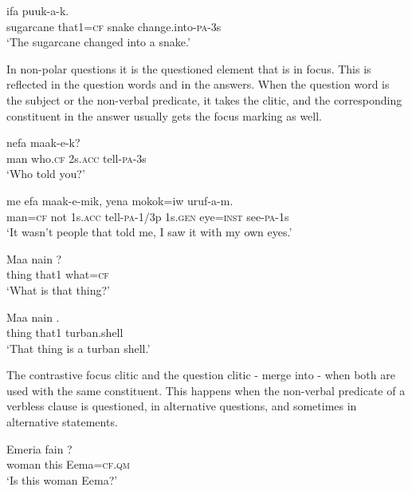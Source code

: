 \ea%
\label{ex:x1711}
\gll {}    ifa  puuk-a-k. \\
sugarcane  that1=\textsc{cf}  snake  change.into-\textsc{pa}-3s      \\
\glt`The sugarcane changed into a snake.'
\z


In non-polar questions it is the questioned element that is in focus. This is reflected in the question words and in the answers. When the question word is the subject or the non-verbal predicate, it takes the  clitic, and the corresponding constituent in the answer usually gets the focus marking as well.

\ea%
\label{ex:x1714}
\gll {}   nefa  maak-e-k?\\
man  who.\textsc{cf}  2s.\textsc{acc}  tell-\textsc{pa}-3s      \\
\glt`Who told you?'
\z


\ea%
\label{ex:x1715}
\gll {}  me  efa  maak-e-mik,  yena  mokok=iw  uruf-a-m. \\
man=\textsc{cf}  not  1s.\textsc{acc}  tell-\textsc{pa}-1/3p  1s.\textsc{gen}  eye=\textsc{inst}  see-\textsc{pa}-1s      \\
\glt`It wasn't people that told me, I saw it with my own eyes.'
\z


\ea%
\label{ex:x1712}
\gll Maa  nain  ? \\
thing  that1  what=\textsc{cf}      \\
\glt`What is that thing?'
\z


\ea%
\label{ex:x1713}
\gll Maa  nain  . \\
thing  that1  turban.shell      \\
\glt`That thing is a turban shell.'
\z
{}


The contrastive focus clitic and the question clitic - merge into - when both are used with the same constituent. This happens when the non-verbal predicate of a verbless clause is questioned, in alternative questions, and sometimes in alternative statements.

\ea%
\label{ex:x1716}
\gll Emeria  fain  ? \\
woman  this  Eema=\textsc{cf}.\textsc{qm}      \\
\glt`Is this woman Eema?'
\z


